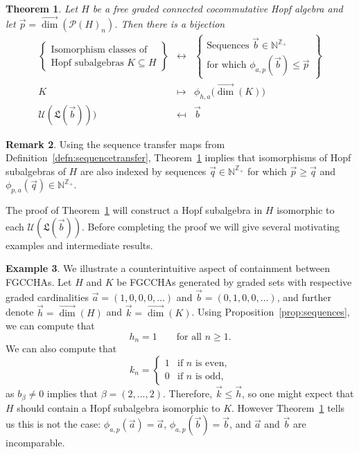 \documentclass[11pt]{amsart}
\newtheorem{theorem}{Theorem}[section]
\theoremstyle{definition}
\newtheorem{example}[theorem]{Example}
\newtheorem{remark}[theorem]{Remark}
\numberwithin{equation}{section}
\def\NN{{\mathbb N}}
\def\ZZ{{\mathbb Z}}
\newcommand{\FGCCHAs}{\textsf{FGCCHA}s\xspace}
\newcommand{\vecdim}{\overrightarrow{\dim}}
\begin{document}
\begin{theorem}
\label{thm:subclassification2}
Let $H$ be a free graded connected cocommutative Hopf algebra and let $\vec{p} = \vecdim(\mathcal{P}(H)_{n})$.  Then there is a bijection
\[
\begin{array}{rcl}
\left\{\begin{array}{c}
\text{Isomorphism classes of} \\
\text{Hopf subalgebras $K \subseteq H$}
\end{array}\right\}
& \leftrightarrow & 
\left\{\begin{array}{c}
\text{Sequences $\vec{b} \in \NN^{\ZZ_{+}}$} \\
\text{for which $\phi_{a, p}(\vec{b}) \le \vec{p}$} 
\end{array}\right\} \\[1.5em]
K & \mapsto & \phi_{h, a} \big( \vecdim(K)\big) \\
\mathcal{U}(\mathfrak{L}(\vec{b}))) & \mapsfrom & \vec{b}
\end{array}
\]
\end{theorem}

\begin{remark}
Using the sequence transfer maps from Definition~\ref{defn:sequencetransfer}, Theorem~\ref{thm:subclassification2} implies that isomorphisms of Hopf subalgebras of $H$ are also indexed by sequences $\vec{q} \in \NN^{\ZZ_{+}}$ for which $\vec{p} \ge \vec{q}$ and $\phi_{p, a}(\vec{q}) \in \NN^{\ZZ_{+}}$.
\end{remark}

The proof of Theorem~\ref{thm:subclassification2} will construct a Hopf subalgebra in $H$ isomorphic to each
$\mathcal{U}(\mathfrak{L}(\vec{b}))$.
Before completing the proof we will give several motivating examples and intermediate results.

\begin{example}
We illustrate a counterintuitive aspect of containment between \FGCCHAs. Let $H$ and $K$ be \FGCCHAs generated by graded sets with respective graded cardinalities $\vec{a}=(1,0,0,0,\dots)$ and $\vec{b}=(0,1,0,0,\dots)$, and further denote $\vec{h} = \vecdim(H)$ and $\vec{k} = \vecdim(K)$.
Using Proposition~\ref{prop:sequences}, we can compute that
\[
h_n = 1 \qquad\text{for all $n \ge 1$}.
\]
We can also compute that
\[
k_{n} = \begin{cases} 1 & \text{if $n$ is even,} \\ 0 & \text{if $n$ is odd,} \end{cases}
\]
as $b_{\beta} \neq 0$ implies that $\beta = (2, \ldots, 2)$.  
Therefore, $\vec{k} \le \vec{h}$, so one might expect that $H$ should contain a Hopf subalgebra isomorphic to $K$.  
However Theorem~\ref{thm:subclassification2} tells us this is not the case: $\phi_{a,p}(\vec{a}) = \vec{a}$, $\phi_{a, p}(\vec{b}) = \vec{b}$, and $\vec{a}$ and $\vec{b}$ are incomparable.
\end{example}
\end{document}
